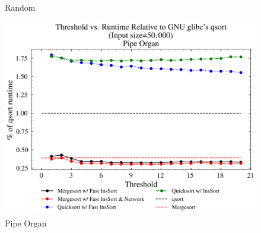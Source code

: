 \documentclass[12pt, conference]{ieeeconf}
\begin{document}
\begin{figure}[H]
	\centering
	\caption{Random}
	\label{fig:random}
\end{figure}
\begin{figure}[H]
	\centering
	\includegraphics[width=\columnwidth]{pipe_organ}
	\caption{Pipe Organ}
	\label{fig:pipe_organ}
\end{figure}
\end{document}
